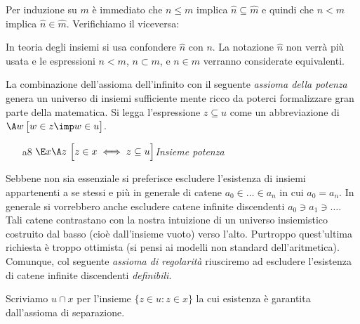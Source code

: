 Per induzione su $m$ \`e immediato che  $n\le m$ implica $\widehat{n}\subseteq\widehat{m}$ e quindi che $n<m$ implica $\widehat{n}\in\widehat{m}$. Verifichiamo il viceversa:

% 
% 
% 
% 
% 

In teoria degli insiemi si usa confondere $\widehat{n}$ con $n$. La notazione $\widehat{n}$ non verr\`a pi\`u usata e le espressioni $n<m$, $n\subset m$, e $n\in m$ verranno considerate equivalenti.%

La combinazione dell'assioma dell'infinito con il seguente \textit{assioma della potenza\/} genera un universo di insiemi sufficiente mente ricco da poterci formalizzare gran parte della matematica. Si legga l'espressione \emph{$z\subseteq u$\/} come un abbreviazione di $\A w\,\big[w\in z\imp w\in u\big]$.

\begin{itemize}
\item[a8]$\E x \A z\ \Big[z\in x \iff z\subseteq u\Big]$\hfill\emph{Insieme potenza} 
\end{itemize}

Sebbene non sia essenziale si preferisce escludere l'esistenza di insiemi appartenenti a se stessi e pi\`u in generale di catene $a_0\in\dots\in a_n$ in cui $a_0=a_n$. In generale si vorrebbero anche escludere catene infinite discendenti $a_0\ni a_1\ni\dots $. Tali catene contrastano con la nostra intuizione di un universo insiemistico costruito dal basso (cio\`e dall'insieme vuoto) verso l'alto. Purtroppo quest'ultima richiesta \`e troppo ottimista (si pensi ai modelli non standard dell'aritmetica). Comunque, col seguente \textit{assioma di regolarit\`a\/} riusciremo ad escludere l'esistenza di catene infinite discendenti \textit{definibili}. 

Scriviamo $u\cap x$ per l'insieme $\{z\in u: z\in x\}$ la cui esistenza \`e garantita dall'assioma di separazione.


